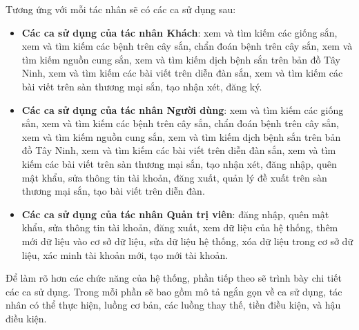 \documentclass[./../main.tex]{subfiles}
\begin{document}
Tương ứng với mỗi tác nhân sẽ có các ca sử dụng sau:
\begin{itemize}
    \item \textbf{Các ca sử dụng của tác nhân Khách}: xem và tìm kiếm các giống sắn, xem và tìm kiếm các bệnh trên cây sắn, chẩn đoán bệnh trên cây sắn, xem và tìm kiếm nguồn cung sắn, xem và tìm kiếm dịch bệnh sắn trên bản đồ Tây Ninh, xem và tìm kiếm các bài viết trên diễn đàn sắn, xem và tìm kiếm các bài viết trên sàn thương mại sắn, tạo nhận xét, đăng ký.
    \item \textbf{Các ca sử dụng của tác nhân Người dùng}: xem và tìm kiếm các giống sắn, xem và tìm kiếm các bệnh trên cây sắn, chẩn đoán bệnh trên cây sắn, xem và tìm kiếm nguồn cung sắn, xem và tìm kiếm dịch bệnh sắn trên bản đồ Tây Ninh, xem và tìm kiếm các bài viết trên diễn đàn sắn, xem và tìm kiếm các bài viết trên sàn thương mại sắn, tạo nhận xét, đăng nhập, quên mật khẩu, sửa thông tin tài khoản, đăng xuất, quản lý đề xuất trên sàn thương mại sắn, tạo bài viết trên diễn đàn.
    \item \textbf{Các ca sử dụng của tác nhân Quản trị viên}: đăng nhập, quên mật khẩu, sửa thông tin tài khoản, đăng xuất, xem dữ liệu của hệ thống, thêm mới dữ liệu vào cơ sở dữ liệu, sửa dữ liệu hệ thống, xóa dữ liệu trong cơ sở dữ liệu, xác minh tài khoản mới, tạo mới tài khoản.
\end{itemize}

Để làm rõ hơn các chức năng của hệ thống, phần tiếp theo sẽ trình bày chi tiết các ca sử dụng. Trong mỗi phần sẽ bao gồm mô tả ngắn gọn về ca sử dụng, tác nhân có thể thực hiện, luồng cơ bản, các luồng thay thế, tiền điều kiện, và hậu điều kiện.
\end{document}
